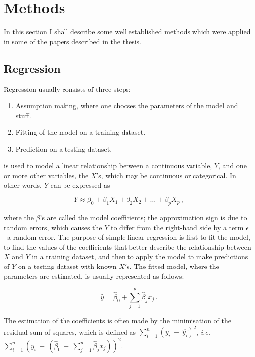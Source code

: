 \documentclass[../main.tex]{subfiles}
\begin{document}
\chapter{Methods}

In this section I shall describe some well established methods which 
were applied in some of the papers described in the thesis.

\section{Regression}

Regression usually consists of three-steps:

\begin{enumerate}
	\item Assumption making, where one chooses the parameters of the 
		model and stuff.
	\item Fitting of the model on a training dataset.
	\item Prediction on a testing dataset.
\end{enumerate}

 is used to model a linear 
relationship between a continuous variable, $Y$, and one or more other 
variables, the $X$'s, which may be continuous or categorical. In other 
words, $Y$ can be expressed as

\begin{equation}
	Y \approx \beta_0 + \beta_1X_1 + \beta_2X_2 + \ldots + \beta_pX_p\,,
\end{equation}

where the $\beta$'s are called the model coefficients; the approximation 
sign is due to random errors, which causes the $Y$ to differ from the 
right-hand side by a term $\epsilon$ --a random error. The purpose of 
simple linear regression is first to fit the model, \ie to find the 
values of the coefficients that better describe the relationship between 
$X$ and $Y$ in a training dataset, and then to apply the model to make 
predictions of $Y$ on a testing dataset with known $X's$. The fitted 
model, where the parameters are estimated, is usually represented as 
follows:

\begin{equation}
	\hat{y} = \hat{\beta}_0 + \sum_{j=1}^{p}\hat{\beta}_j x_j\,.
\end{equation}

The estimation of the coefficients is often made by the minimisation of 
the residual sum of squares, which is defined as 
$\sum_{i=1}^{n}(y_i~-~\hat{y_i})^2$, \textit{i.e.}\ 
$\sum_{i=1}^{n}(y_i~-~(\hat{\beta}_0~+~\sum_{j=1}^{p}\hat{\beta}_jx_j))^2$.
\end{document}
